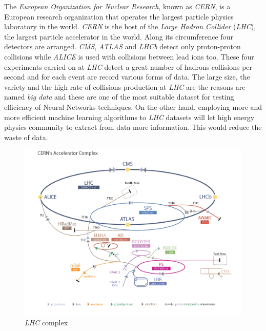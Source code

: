 The \textit{European Organization for Nuclear Research}, known as
\textit{CERN}, is a European research organization that operates the
largest particle physics laboratory in the world. \textit{CERN} is the
host of the \textit{Large Hadron Collider} (\textit{LHC}), the largest
particle accelerator in the world. Along its circumference four detectors
are arranged. \textit{CMS}, \textit{ATLAS} and \textit{LHCb} detect only
proton-proton collisions while \textit{ALICE} is used with collisions
between lead ions too. These four experiments carried on at \textit{LHC}
detect a great number of hadrons collisions per second and for each event
are record various forms of data. The large size, the variety and the high
rate of collisions production at \textit{LHC} are the reasons are named
\textit{big data} and these are one of the most suitable dataset for
testing efficiency of Neural Networks techniques. On the other hand,
employing more and more efficient machine learning algorithms to
\textit{LHC} datasets will let high energy physics community to extract
from data more information. This would reduce the waste of data.

\begin{figure}[htpb]
 \centering
 \includegraphics[scale=0.18]{figures/lhc2.png}
 \caption{\textit{LHC} complex}
 \label{}
\end{figure}

